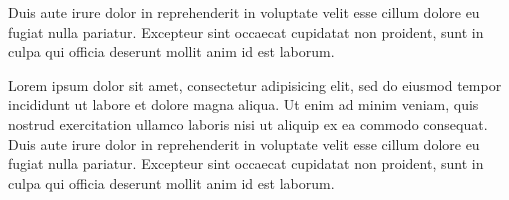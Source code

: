 \documentclass[a4paper, 12pt]{report}
\begin{document}
Duis aute irure dolor in reprehenderit in voluptate velit esse
cillum dolore eu fugiat nulla pariatur. Excepteur sint occaecat cupidatat non
proident, sunt in culpa qui officia deserunt mollit anim id est laborum.

Lorem ipsum dolor sit amet, consectetur adipisicing elit, sed do eiusmod
tempor incididunt ut labore et dolore magna aliqua. Ut enim ad minim veniam,
quis nostrud exercitation ullamco laboris nisi ut aliquip ex ea commodo
consequat. Duis aute irure dolor in reprehenderit in voluptate velit esse
cillum dolore eu fugiat nulla pariatur. Excepteur sint occaecat cupidatat non
proident, sunt in culpa qui officia deserunt mollit anim id est laborum.
\end{document}
